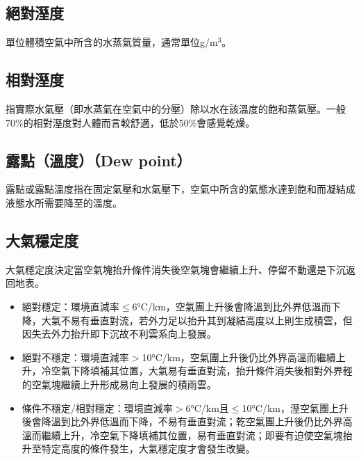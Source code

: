 \documentclass[a4paper,12pt]{report}
\begin{document}
\subsection{絕對溼度}
單位體積空氣中所含的水蒸氣質量，通常單位g/m$^3$。
\subsection{相對溼度}
指實際水氣壓（即水蒸氣在空氣中的分壓）除以水在該溫度的飽和蒸氣壓。一般70\%的相對溼度對人體而言較舒適，低於50\%會感覺乾燥。
\subsection{露點（溫度）（Dew point）}
露點或露點溫度指在固定氣壓和水氣壓下，空氣中所含的氣態水達到飽和而凝結成液態水所需要降至的溫度。
\subsection{大氣穩定度}
大氣穩定度決定當空氣塊抬升條件消失後空氣塊會繼續上升、停留不動還是下沉返回地表。
\begin{itemize}
  \item 絕對穩定：環境直減率$\leq$6°C/km，空氣團上升後會降溫到比外界低溫而下降，大氣不易有垂直對流，若外力足以抬升其到凝結高度以上則生成積雲，但因失去外力抬升即下沉故不利雲系向上發展。
  \item 絕對不穩定：環境直減率$>$10°C/km，空氣團上升後仍比外界高溫而繼續上升，冷空氣下降填補其位置，大氣易有垂直對流，抬升條件消失後相對外界輕的空氣塊繼續上升形成易向上發展的積雨雲。
  \item 條件不穩定/相對穩定：環境直減率$>$6°C/km且$\leq$10°C/km，溼空氣團上升後會降溫到比外界低溫而下降，不易有垂直對流；乾空氣團上升後仍比外界高溫而繼續上升，冷空氣下降填補其位置，易有垂直對流；即要有迫使空氣塊抬升至特定高度的條件發生，大氣穩定度才會發生改變。
\end{itemize}
\end{document}

